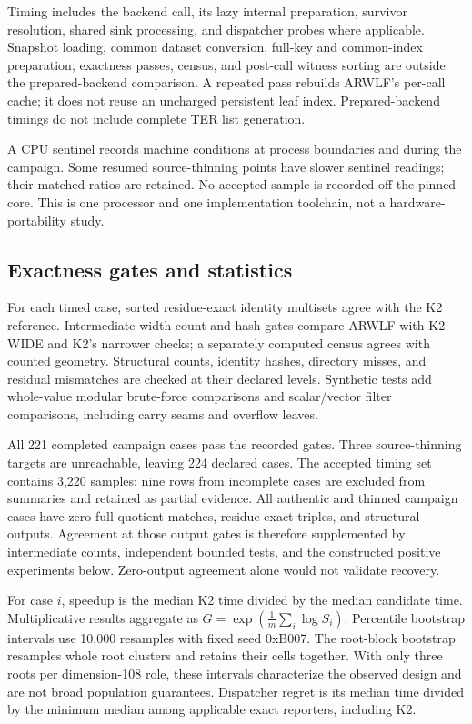 \documentclass[manuscript,screen,review]{acmart}
\begin{document}
Timing includes the backend call, its lazy internal preparation, survivor resolution, shared sink processing, and dispatcher probes where applicable. Snapshot loading, common dataset conversion, full-key and common-index preparation, exactness passes, census, and post-call witness sorting are outside the prepared-backend comparison. A repeated pass rebuilds ARWLF's per-call cache; it does not reuse an uncharged persistent leaf index. Prepared-backend timings do not include complete TER list generation.

A CPU sentinel records machine conditions at process boundaries and during the campaign. Some resumed source-thinning points have slower sentinel readings; their matched ratios are retained. No accepted sample is recorded off the pinned core. This is one processor and one implementation toolchain, not a hardware-portability study.

\subsection{Exactness gates and statistics}
For each timed case, sorted residue-exact identity multisets agree with the K2 reference. Intermediate width-count and hash gates compare ARWLF with K2-WIDE and K2's narrower checks; a separately computed census agrees with counted geometry. Structural counts, identity hashes, directory misses, and residual mismatches are checked at their declared levels. Synthetic tests add whole-value modular brute-force comparisons and scalar/vector filter comparisons, including carry seams and overflow leaves.

All 221 completed campaign cases pass the recorded gates. Three source-thinning targets are unreachable, leaving 224 declared cases. The accepted timing set contains 3,220 samples; nine rows from incomplete cases are excluded from summaries and retained as partial evidence. All authentic and thinned campaign cases have zero full-quotient matches, residue-exact triples, and structural outputs. Agreement at those output gates is therefore supplemented by intermediate counts, independent bounded tests, and the constructed positive experiments below. Zero-output agreement alone would not validate recovery.

For case $i$, speedup is the median K2 time divided by the median candidate time. Multiplicative results aggregate as $G=\exp(\frac1m\sum_i\log S_i)$. Percentile bootstrap intervals use 10,000 resamples with fixed seed 0xB007. The root-block bootstrap resamples whole root clusters and retains their cells together. With only three roots per dimension-108 role, these intervals characterize the observed design and are not broad population guarantees. Dispatcher regret is its median time divided by the minimum median among applicable exact reporters, including K2.
\end{document}

